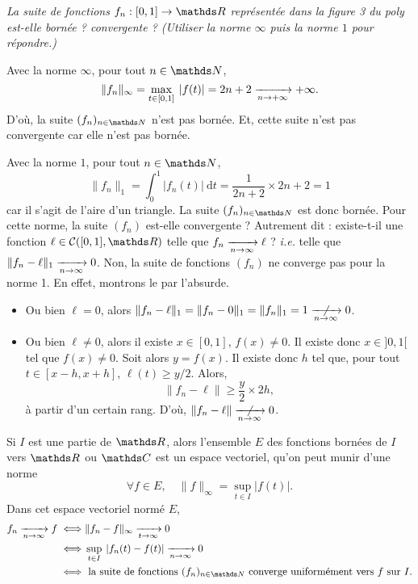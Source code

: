 \begin{exo}
	\textsl{La suite de fonctions $f_n : [0,1] \to \R$\/ représentée dans la figure 3 du poly est-elle bornée ? convergente ? (Utiliser la norme $\infty$\/ puis la norme $1$\/ pour répondre.)}

	Avec la norme $\infty$, pour tout $n \in \N$, \[
		\|f_n\|_\infty = \max_{t \in [0, 1]} \:|f(t)| = 2n + 2 \xrightarrow[n\to +\infty]{} +\infty
	.\]D'où, la suite $(f_n)_{n\in\N}$\/ n'est pas bornée.
	Et, cette suite n'est pas convergente car elle n'est pas bornée.

	Avec la norme $1$, pour tout $n \in \N$, \[
		\|f_n\|_1 = \int_{0}^{1} |f_n(t)|~\mathrm{d}t = \frac{1}{2n + 2} \times 2n + 2 = 1
	\] car il s'agit de l'aire d'un triangle. La suite $(f_n)_{n\in\N}$\/ est donc bornée.
	Pour cette norme, la suite $(f_n)$\/ est-elle convergente ? Autrement dit : existe-t-il une fonction $\ell \in \mathcal{C}([0,1], \R)$\/ telle que $f_n \xrightarrow[n\to \infty]{} \ell$\/ ? \textit{i.e.} telle que $\|f_n - \ell\|_1 \xrightarrow[n\to \infty]{} 0$.
	Non, la suite de fonctions $(f_n)$\/ ne converge pas pour la norme 1. En effet, montrons le par l'absurde.
	\begin{itemize}
		\item Ou bien $\ell = 0$, alors $\|f_n - \ell\|_1 = \|f_n - 0\|_1 = \|f_n\|_1 = 1 \centernot{\tendsto{n\to \infty}} 0$.
		\item Ou bien $\ell \neq 0$\/, alors il existe $x \in [0,1]$, $f(x) \neq 0$. Il existe donc $x \in {]0,1[}$\/ tel que $f(x) \neq 0$. Soit alors $y = f(x)$.
			Il existe donc $h$\/ tel que, pour tout $t \in [x - h, x + h]$, $\ell(t) \ge y / 2$.
			Alors,  \[
				\|f_n - \ell\|\ge \frac{y}{2} \times 2h
			,\] à partir d'un certain rang. D'où, $\|f_n - \ell\|\centernot{\tendsto{n\to \infty}} 0$.
	\end{itemize}
\end{exo}

\begin{rmk}
	Si $I$\/ est une partie de $\R$, alors l'ensemble $E$\/ des fonctions bornées de $I$\/ vers $\R$\/ ou $\C$\/ est un espace vectoriel, qu'on peut munir d'une norme \[
		\forall f \in E,\quad \|f\|_\infty = \sup_{t \in I} |f(t)|
	.\]
	Dans cet espace vectoriel normé $E$,
	\begin{align*}
		f_n \tendsto{n\to \infty} f \iff& \|f_n - f\|_\infty \tendsto{t \to \infty} 0 \\
		\iff& \sup_{t \in I} \:|f_n(t) - f(t)| \tendsto{n\to \infty} 0 \\
		\iff& \text{ la suite de fonctions $(f_n)_{n\in\N}$\/ converge uniformément vers $f$\/ sur $I$.} \\
	\end{align*}
\end{rmk}

